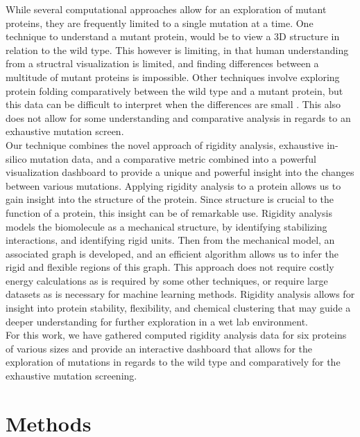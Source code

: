\documentclass[11pt]{IEEEtran}
\begin{document}
While several computational approaches allow for an exploration of mutant proteins, they are frequently limited to a single mutation at a time.  One technique to understand a mutant protein, would be to view a 3D structure in relation to the wild type. This however is limiting, in that human understanding from a structral visualization is limited, and finding differences between a multitude of mutant proteins is impossible. Other techniques involve exploring protein folding comparatively between the wild type and a mutant protein, but this data can be difficult to interpret when the differences are small \cite{b4}. This also does not allow for some understanding and comparative analysis in regards to an exhaustive mutation screen.\\ 

Our technique combines the novel approach of rigidity analysis, exhaustive in-silico mutation data, and a comparative metric combined into a powerful visualization dashboard to provide a unique and powerful insight into the changes between various mutations. Applying rigidity analysis to a protein allows us to gain insight into the structure of the protein. Since structure is crucial to the function of a protein, this insight can be of remarkable use. Rigidity analysis models the biomolecule as a mechanical structure, by identifying stabilizing interactions, and identifying rigid units. Then from the mechanical model, an associated graph is developed, and an efficient algorithm allows us to infer the rigid and flexible regions of this graph. This approach does not require costly energy calculations as is required by some other techniques, or require large datasets as is necessary for machine learning methods. Rigidity analysis allows for insight into protein stability, flexibility, and chemical clustering that may guide a deeper understanding for further exploration in a wet lab environment.\\

For this work, we have gathered computed rigidity analysis data for six proteins of various sizes and provide an interactive dashboard that allows for the exploration of mutations in regards to the wild type and comparatively for the exhaustive mutation screening.



\section{Methods}
\end{document}
